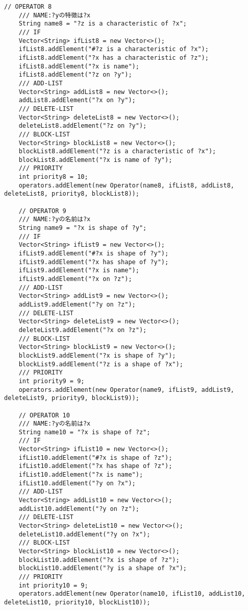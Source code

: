 \documentclass{jarticle}
\begin{document}
\begin{lstlisting}[caption=色や形を扱うオペレータ,label=src:operator]
    // OPERATOR 8
    /// NAME:?yの特徴は?x
    String name8 = "?z is a characteristic of ?x";
    /// IF
    Vector<String> ifList8 = new Vector<>();
    ifList8.addElement("#?z is a characteristic of ?x");
    ifList8.addElement("?x has a characteristic of ?z");
    ifList8.addElement("?x is name");
    ifList8.addElement("?z on ?y");
    /// ADD-LIST
    Vector<String> addList8 = new Vector<>();
    addList8.addElement("?x on ?y");
    /// DELETE-LIST
    Vector<String> deleteList8 = new Vector<>();
    deleteList8.addElement("?z on ?y");
    /// BLOCK-LIST
    Vector<String> blockList8 = new Vector<>();
    blockList8.addElement("?z is a characteristic of ?x");
    blockList8.addElement("?x is name of ?y");
    /// PRIORITY
    int priority8 = 10;
    operators.addElement(new Operator(name8, ifList8, addList8, deleteList8, priority8, blockList8));
    
    // OPERATOR 9
    /// NAME:?yの名前は?x
    String name9 = "?x is shape of ?y";
    /// IF
    Vector<String> ifList9 = new Vector<>();
    ifList9.addElement("#?x is shape of ?y");
    ifList9.addElement("?x has shape of ?y");
    ifList9.addElement("?x is name");
    ifList9.addElement("?x on ?z");
    /// ADD-LIST
    Vector<String> addList9 = new Vector<>();
    addList9.addElement("?y on ?z");
    /// DELETE-LIST
    Vector<String> deleteList9 = new Vector<>();
    deleteList9.addElement("?x on ?z");
    /// BLOCK-LIST
    Vector<String> blockList9 = new Vector<>();
    blockList9.addElement("?x is shape of ?y");
    blockList9.addElement("?z is a shape of ?x");
    /// PRIORITY
    int priority9 = 9;
    operators.addElement(new Operator(name9, ifList9, addList9, deleteList9, priority9, blockList9));
    
    // OPERATOR 10
    /// NAME:?yの名前は?x
    String name10 = "?x is shape of ?z";
    /// IF
    Vector<String> ifList10 = new Vector<>();
    ifList10.addElement("#?x is shape of ?z");
    ifList10.addElement("?x has shape of ?z");
    ifList10.addElement("?x is name");
    ifList10.addElement("?y on ?x");
    /// ADD-LIST
    Vector<String> addList10 = new Vector<>();
    addList10.addElement("?y on ?z");
    /// DELETE-LIST
    Vector<String> deleteList10 = new Vector<>();
    deleteList10.addElement("?y on ?x");
    /// BLOCK-LIST
    Vector<String> blockList10 = new Vector<>();
    blockList10.addElement("?x is shape of ?z");
    blockList10.addElement("?y is a shape of ?x");
    /// PRIORITY
    int priority10 = 9;
    operators.addElement(new Operator(name10, ifList10, addList10, deleteList10, priority10, blockList10));
    

\end{lstlisting}
\end{document}
